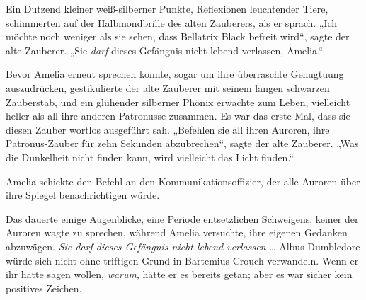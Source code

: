 Ein Dutzend kleiner weiß-silberner Punkte, Reflexionen leuchtender Tiere, schimmerten auf der Halbmondbrille des alten Zauberers, als er sprach.
„Ich möchte noch weniger als sie sehen, dass Bellatrix Black befreit wird“, sagte der alte Zauberer.
„Sie \emph{darf} dieses Gefängnis nicht lebend verlassen, Amelia.“

Bevor Amelia erneut sprechen konnte, sogar um ihre überraschte Genugtuung auszudrücken, gestikulierte der alte Zauberer mit seinem langen schwarzen Zauberstab, und ein glühender silberner Phönix erwachte zum Leben, vielleicht heller als all ihre anderen Patronusse zusammen. Es war das erste Mal, dass sie diesen Zauber wortlos ausgeführt sah.
„Befehlen sie all ihren Auroren, ihre Patronus-Zauber für zehn Sekunden abzubrechen“, sagte der alte Zauberer.
„Was die Dunkelheit nicht finden kann, wird vielleicht das Licht finden.“

Amelia schickte den Befehl an den Kommunikationsoffizier, der alle Auroren über ihre Spiegel benachrichtigen würde.

Das dauerte einige Augenblicke, eine Periode entsetzlichen Schweigens, keiner der Auroren wagte zu sprechen, während Amelia versuchte, ihre eigenen Gedanken abzuwägen. \emph{Sie darf dieses Gefängnis nicht lebend verlassen} … Albus Dumbledore würde sich nicht ohne triftigen Grund in Bartemius Crouch verwandeln. Wenn er ihr hätte sagen wollen, \emph{warum}, hätte er es bereits getan; aber es war sicher kein positives Zeichen.

